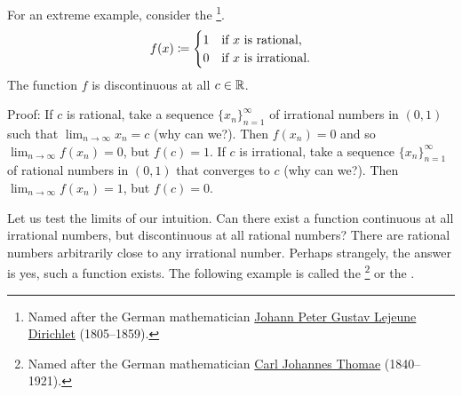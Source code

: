 \begin{example}
For an extreme example, consider the
\emph{}\footnote{Named after the German
mathematician
\href{https://en.wikipedia.org/wiki/Peter_Gustav_Lejeune_Dirichlet}{Johann Peter Gustav Lejeune
Dirichlet}
(1805--1859).}.
\begin{equation*}
f(x) \coloneqq
\begin{cases}
1 & \text{if } x \text{ is rational,} \\
0 & \text{if } x \text{ is irrational.}
\end{cases}
\avoidbreak
\end{equation*}
The function $f$ is discontinuous at all $c \in {\mathbb{R}}$.

Proof:
If $c$ is rational, take a sequence $\{ x_n \}_{n=1}^\infty$
of irrational numbers in $(0,1)$ such that $\lim_{n\to\infty} x_n = c$ (why can we?).  Then $f(x_n) = 0$
and so $\lim_{n\to\infty} f(x_n) = 0$, but $f(c) = 1$.
If $c$ is irrational, take a sequence
$\{ x_n \}_{n=1}^\infty$
of rational numbers in $(0,1)$
that converges to $c$ (why can we?).  Then $\lim_{n\to\infty} f(x_n) = 1$, but $f(c) = 0$.
\end{example}

Let us test the limits of our intuition.  Can
there exist a function continuous at all irrational numbers, but
discontinuous at all rational numbers?  There are rational numbers
arbitrarily close to any irrational number.  Perhaps strangely, the
answer is yes, such a function exists.  The following example is called the
\emph{}\footnote{Named after the German
mathematician
\href{https://en.wikipedia.org/wiki/Carl_Johannes_Thomae}{Carl Johannes Thomae}
(1840--1921).} or the
\emph{}.

